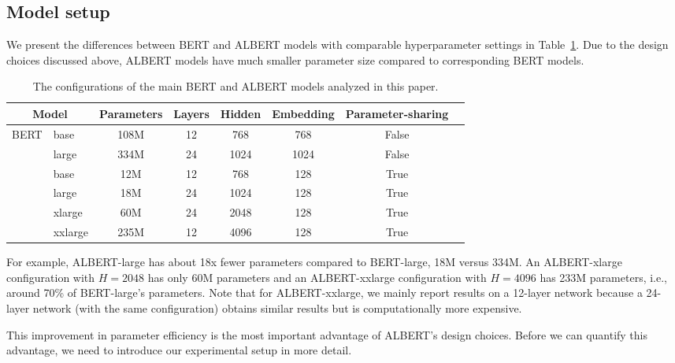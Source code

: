\subsection{Model setup}
We present the differences between BERT and ALBERT models with comparable hyperparameter settings in Table~\ref{table:model_architecture}.
Due to the design choices discussed above, ALBERT models have much smaller parameter size compared to corresponding BERT models.


\begin{table}
\small
\centering
\begin{tabular}{l  l | c c c c c c}
 \multicolumn{2}{c}{Model}          &Parameters	&Layers &Hidden &Embedding  &Parameter-sharing \\
\hline
\multirow{3}{*}{BERT}    & base	    &108M    &12 & 768  & 768  & False\\
                         & large	&334M	 &24 & 1024 & 1024 & False\\
    \hline
\multirow{4}{*}{ALBERT}  &base	    &12M     &12 & 768  & 128  & True \\
                         &large	    &18M	 &24 & 1024 & 128  & True\\
                         &xlarge	&60M	 &24 & 2048 & 128  & True\\
                         &xxlarge	&235M	 &12 & 4096 & 128  & True\\
\end{tabular}
\caption{The configurations of the main BERT and ALBERT models analyzed in this paper.}
\label{table:model_architecture}
\end{table}

For example, ALBERT-large has about 18x fewer parameters compared to BERT-large, 18M versus 334M.
An ALBERT-xlarge configuration with $H=2048$ has only 60M parameters and an ALBERT-xxlarge configuration with $H=4096$ has 233M parameters, i.e., around 70\% of BERT-large's parameters.
Note that for ALBERT-xxlarge, we mainly report results on a 12-layer network because a 24-layer network (with the same configuration) obtains similar results but is computationally more expensive.

This improvement in parameter efficiency is the most important advantage of ALBERT's design choices. 
Before we can quantify this advantage, we need to introduce our experimental setup in more detail.


